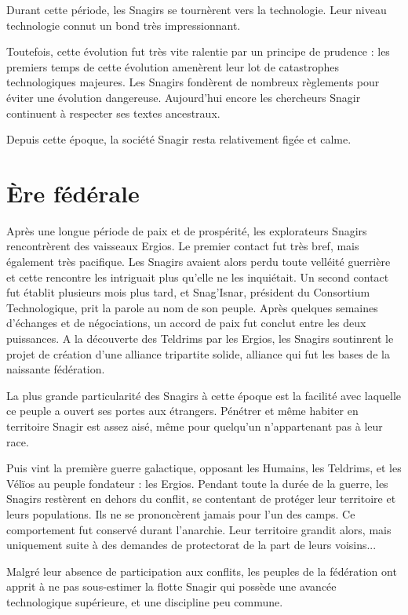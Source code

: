 \begin{multicols}{2}
Durant cette période, les Snagirs se tournèrent vers la technologie. Leur niveau technologie connut un bond très impressionnant. 

Toutefois, cette évolution fut très vite ralentie par un principe de prudence : les premiers temps de cette évolution amenèrent leur lot de catastrophes technologiques majeures. Les Snagirs fondèrent de nombreux règlements pour éviter une évolution dangereuse. Aujourd’hui encore les chercheurs Snagir continuent à respecter ses textes ancestraux.

Depuis cette époque, la société Snagir resta relativement figée et calme.

\section{Ère fédérale}

Après une longue période de paix et de prospérité, les explorateurs Snagirs rencontrèrent des vaisseaux Ergios. Le premier contact fut très bref, mais également très pacifique. Les Snagirs avaient alors perdu toute velléité guerrière et cette rencontre les intriguait plus qu'elle ne les inquiétait. Un second contact fut établit plusieurs mois plus tard, et Snag'Isnar, président du Consortium Technologique, prit la parole au nom de son peuple. Après quelques semaines d'échanges et de négociations, un accord de paix fut conclut entre les deux puissances. A la découverte des Teldrims par les Ergios, les Snagirs soutinrent le projet de création d'une alliance tripartite solide, alliance qui fut les bases de la naissante fédération.

La plus grande particularité des Snagirs à cette époque est la facilité avec laquelle ce peuple a ouvert ses portes aux étrangers. Pénétrer et même habiter en territoire Snagir est assez aisé, même pour quelqu'un n'appartenant pas à leur race.

Puis vint la première guerre galactique, opposant les Humains, les Teldrims, et les Vélïos au peuple fondateur : les Ergios. Pendant toute la durée de la guerre, les Snagirs restèrent en dehors du conflit, se contentant de protéger leur territoire et leurs populations. Ils ne se prononcèrent jamais pour l'un des camps. Ce comportement fut conservé durant l'anarchie. Leur territoire grandit alors, mais uniquement suite à des demandes de protectorat de la part de leurs voisins...

Malgré leur absence de participation aux conflits, les peuples de la fédération ont apprit à ne pas sous-estimer la flotte Snagir qui possède une avancée technologique supérieure, et une discipline peu commune.

\end{multicols}

